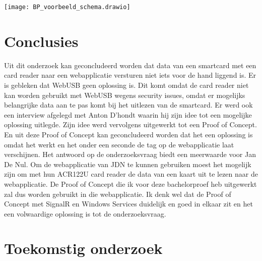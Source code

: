 \documentclass[a0,portrait]{hogent-poster}
\begin{document}
\begin{multicols}{2}


\begin{center}
  \captionsetup{type=figure}
  \texttt{[image: BP\_voorbeeld\_schema.drawio]}
\end{center}


\section{Conclusies}

Uit dit onderzoek kan geconcludeerd worden dat data van een smartcard met een card reader naar een webapplicatie versturen niet iets voor de hand liggend is. Er is gebleken dat WebUSB geen oplossing is. Dit komt omdat de card reader niet kan worden gebruikt met WebUSB wegens security issues, omdat er mogelijks belangrijke data aan te pas komt bij het uitlezen van de smartcard. 
Er werd ook een interview afgelegd met Anton D'hondt waarin hij zijn idee tot een mogelijke oplossing uitlegde. Zijn idee werd vervolgens uitgewerkt tot een Proof of Concept. En uit deze Proof of Concept kan geconcludeerd worden dat het een oplossing is omdat het werkt en het onder een seconde de tag op de webapplicatie laat verschijnen. 
Het antwoord op de onderzoeksvraag biedt een meerwaarde voor Jan De Nul. Om de webapplicatie van JDN te kunnen gebruiken moest het mogelijk zijn om met hun ACR122U card reader de data van een kaart uit te lezen naar de webapplicatie. De Proof of Concept die ik voor deze bachelorproef heb uitgewerkt zal dus worden gebruikt in die webapplicatie. Ik denk wel dat de Proof of Concept met SignalR en Windows Services duidelijk en goed in elkaar zit en het een volwaardige oplossing is tot de onderzoeksvraag.

\section{Toekomstig onderzoek}


\end{multicols}
\end{document}
